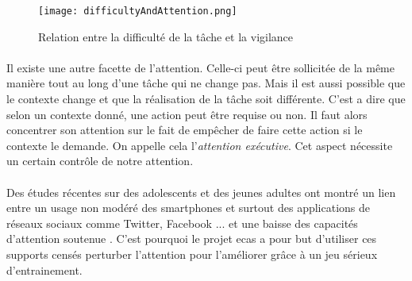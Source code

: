 \begin{figure}[H]
    \begin{center}
    \texttt{[image: difficultyAndAttention.png]}
    \end{center}
    \caption{Relation entre la difficulté de la tâche et la vigilance}
\label{DifficultyAndAttention}
\end{figure}

\paragraph{}Il existe une autre facette de l'attention. Celle-ci peut être sollicitée de la même manière tout au long d'une tâche qui ne change pas. Mais il est aussi possible que le
contexte change et que la réalisation de la tâche soit différente. C'est a dire que selon un contexte donné, une action peut être requise ou non. Il faut alors concentrer son
attention sur le fait de empêcher de faire cette action si le contexte le demande. On appelle cela l'\emph{attention exécutive}. Cet aspect nécessite un certain contrôle de notre
attention.


\paragraph{}Des études récentes sur des adolescents et des jeunes adultes ont montré un lien entre un usage non modéré des smartphones et surtout des applications de réseaux sociaux
comme Twitter, Facebook ... et une baisse des capacités d'attention soutenue \cite{ART01}. C'est pourquoi le projet \gls{ecas} a pour but d'utiliser ces supports censés perturber l'attention
pour l'améliorer grâce à un jeu sérieux d'entrainement.